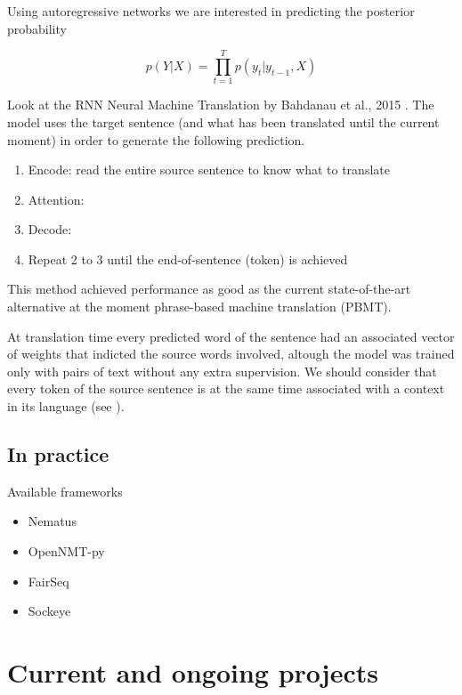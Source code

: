Using autoregressive networks we are interested in predicting the posterior
probability

\begin{equation}
  p(Y|X) = \prod_{t=1}^T p(y_t|y_{t-1}, X)
\end{equation}

Look at the RNN Neural Machine Translation by Bahdanau et al., 2015
\cite{bahdanau2014neural}. The model uses the target sentence (and what has
been translated until the current moment) in order to generate the following
prediction.

\begin{enumerate}
  \item Encode: read the entire source sentence to know what to translate
  \item Attention:
  \item Decode:
  \item Repeat 2 to 3 until the end-of-sentence (token) is achieved
\end{enumerate}

This method achieved performance as good as the current state-of-the-art
alternative at the moment phrase-based machine translation (PBMT).

At translation time every predicted word of the sentence had an associated
vector of weights that indicted the source words involved, altough the model
was trained only with pairs of text without any extra supervision. We should
consider that every token of the source sentence is at the same time associated
with a context in its language (see \cite{jean2015montreal}).

\subsection{In practice}

Available frameworks

\begin{itemize}
  \item Nematus \cite{sennrich2017nematus}
  \item OpenNMT-py \cite{opennmt}
  \item FairSeq \cite{gehring2017convs2s}
  \item Sockeye \cite{Sockeye:17}
\end{itemize}

\section{Current and ongoing projects}

